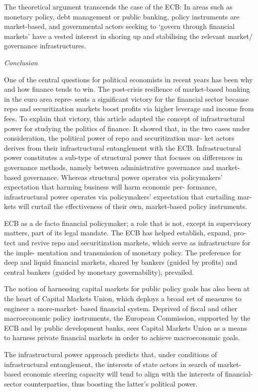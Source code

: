 \documentclass[
]{book}
\begin{document}
The theoretical argument transcends
the case of the ECB: In areas such as monetary policy, debt management or public banking,
policy instruments are market-based, and governmental actors seeking to `govern through
financial markets' have a vested interest in shoring up and stabilising the relevant market/
governance infrastructures.

\emph{Conclusion}

One of the central questions for political economists in recent years has been why and how
finance tends to win. The post-crisis resilience of market-based banking in the euro area repre-
sents a significant victory for the financial sector because repo and securitization markets
boost profits via higher leverage and income from fees. To explain that victory, this article
adapted the concept of infrastructural power for studying the politics of finance. It showed
that, in the two cases under consideration, the political power of repo and securitization mar-
ket actors derives from their infrastructural entanglement with the ECB. Infrastructural power
constitutes a sub-type of structural power that focuses on differences in governance methods,
namely between administrative governance and market-based governance. Whereas structural
power operates via policymakers' expectation that harming business will harm economic per-
formance, infrastructural power operates via policymakers' expectation that curtailing mar-
kets will curtail the effectiveness of their own, market-based policy instruments.

ECB as a de facto financial policymaker; a role that is not, except in supervisory
matters, part of its legal mandate.
The ECB has helped establish, expand, pro-
tect and revive repo and securitization markets, which serve as infrastructure for the imple-
mentation and transmission of monetary policy.
The preference for deep and liquid financial markets, shared by bankers
(guided by profits) and central bankers (guided by monetary governability), prevailed.

The notion of harnessing capital markets for public policy goals has also been at the heart of
Capital Markets Union, which deploys a broad set of measures to engineer a more-market-
based financial system. Deprived of fiscal and other macroeconomic policy instruments, the
European Commission, supported by the ECB and by public development banks, sees
Capital Markets Union as a means to harness private financial markets in order to achieve
macroeconomic goals.

The infrastructural power approach predicts that, under conditions of infrastructural
entanglement, the interests of state actors in search of market-based economic steering
capacity will tend to align with the interests of financial-sector counterparties, thus boosting
the latter's political power.
\end{document}
